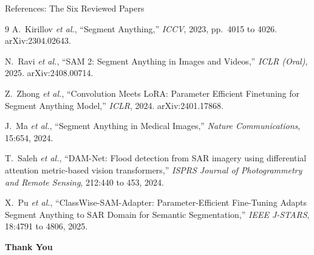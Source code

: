 \documentclass[10pt,aspectratio=169]{beamer}
\begin{document}
\begin{frame}{References: The Six Reviewed Papers}
\providecommand{\bibsection}{}
\renewcommand{\bibsection}{}
\footnotesize
\begin{thebibliography}{9}
A.\ Kirillov \textit{et al.}, ``Segment Anything,'' \textit{ICCV}, 2023, pp.\ 4015 to 4026. arXiv:2304.02643.

N.\ Ravi \textit{et al.}, ``SAM 2: Segment Anything in Images and Videos,'' \textit{ICLR (Oral)}, 2025. arXiv:2408.00714.

Z.\ Zhong \textit{et al.}, ``Convolution Meets LoRA: Parameter Efficient Finetuning for Segment Anything Model,'' \textit{ICLR}, 2024. arXiv:2401.17868.

J.\ Ma \textit{et al.}, ``Segment Anything in Medical Images,'' \textit{Nature Communications}, 15:654, 2024.

T.\ Saleh \textit{et al.}, ``DAM-Net: Flood detection from SAR imagery using differential attention metric-based vision transformers,'' \textit{ISPRS Journal of Photogrammetry and Remote Sensing}, 212:440 to 453, 2024.

X.\ Pu \textit{et al.}, ``ClassWise-SAM-Adapter: Parameter-Efficient Fine-Tuning Adapts Segment Anything to SAR Domain for Semantic Segmentation,'' \textit{IEEE J-STARS}, 18:4791 to 4806, 2025.
\end{thebibliography}
\end{frame}

\begin{frame}[plain]
\begin{center}
\vfill
{\Huge \textcolor{primaryblue}{\textbf{Thank You}}}
\vfill
\end{center}
\end{frame}
\end{document}
